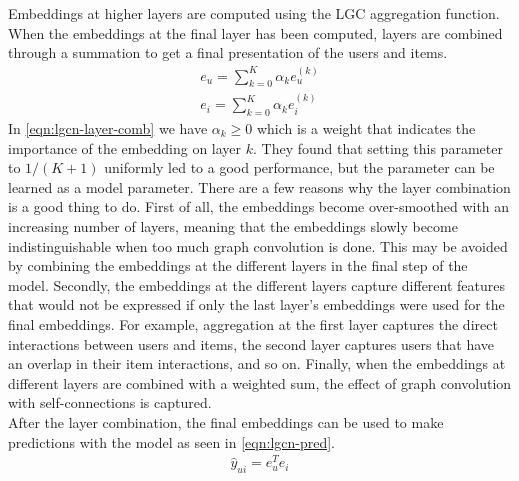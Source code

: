 Embeddings at higher layers are computed using the LGC aggregation function. 
When the embeddings at the final layer has been computed, layers are combined through a summation to get a final presentation of the users and items.
\begin{align}\label{eqn:lgcn-layer-comb}
    e_{u} = \sum_{k=0}^K \alpha_k e_{u}^{(k)} \nonumber\\
    e_{i} = \sum_{k=0}^K \alpha_k e_{i}^{(k)}
\end{align}
In \autoref{eqn:lgcn-layer-comb} we have $\alpha_k \geq 0$ which is a weight that indicates the importance of the embedding on layer $k$.
They found that setting this parameter to $1/(K+1)$ uniformly led to a good performance, but the parameter can be learned as a model parameter.
There are a few reasons why the layer combination is a good thing to do.
First of all, the embeddings become over-smoothed with an increasing number of layers, meaning that the embeddings slowly become indistinguishable when too much graph convolution is done.
This may be avoided by combining the embeddings at the different layers in the final step of the model.
Secondly, the embeddings at the different layers capture different features that would not be expressed if only the last layer's embeddings were used for the final embeddings.
For example, aggregation at the first layer captures the direct interactions between users and items, the second layer captures users that have an overlap in their item interactions, and so on.
Finally, when the embeddings at different layers are combined with a weighted sum, the effect of graph convolution with self-connections is captured.
\\
After the layer combination, the final embeddings can be used to make predictions with the model as seen in \autoref{eqn:lgcn-pred}.
\begin{align}\label{eqn:lgcn-pred}
    \hat{y}_{ui} = e_{u}^T e_i
\end{align}

